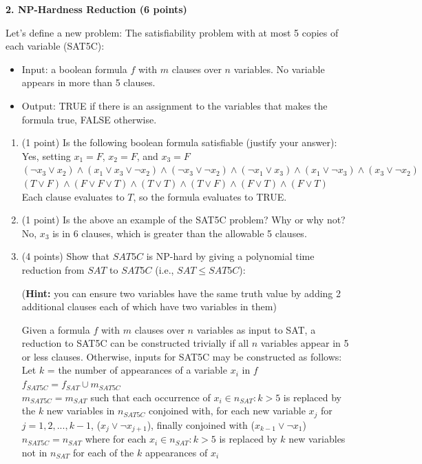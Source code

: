 \documentclass[12pt]{elsart}
\begin{document}
{\bf 2.  NP-Hardness Reduction (6 points)}

Let's define a new problem: The satisfiability problem with at most 5 copies of each variable (SAT5C):
\begin{itemize}
  \item Input: a boolean formula $f$ with $m$ clauses over $n$ variables.  No variable appears in more than 5 clauses.
  \item Output: TRUE if there is an assignment to the variables that makes the formula true, FALSE otherwise.
\end{itemize}

\begin{enumerate}
\item (1 point) Is the following boolean formula satisfiable (justify your answer): \\
Yes, setting $x_1 = F$, $x_2 = F$, and $x_3 = F$ \\
{\normalsize $  ( \neg x_3 \vee  x_2) \wedge (x_1 \vee x_3 \vee \neg x_2) \wedge ( \neg x_3 \vee \neg x_2) \wedge (\neg x_1 \vee x_3)  \wedge (x_1 \vee \neg x_3) \wedge ( x_3 \vee \neg x_2)$} \\
{\normalsize $  ( T \vee  F) \wedge (F \vee F \vee T) \wedge (T \vee T) \wedge (T \vee F)  \wedge (F \vee T) \wedge (F \vee T)$} \\
Each clause evaluates to $T$, so the formula evaluates to TRUE.

\item (1 point) Is the above an example of the SAT5C problem?  Why or why not? \\
No, $x_3$ is in 6 clauses, which is greater than the allowable 5 clauses.

\newpage

\item (4 points) Show that $SAT5C$ is NP-hard by giving a polynomial time reduction from $SAT$ to $SAT5C$ (i.e., {\bf $SAT \leq SAT5C$}):

({\bf Hint:} you can ensure two variables have the same truth value by adding 2 additional clauses each of which have two variables in them) 

Given a formula $f$ with $m$ clauses over $n$ variables as input to SAT, a reduction to SAT5C can be constructed trivially if all $n$ variables appear in 5 or less clauses. Otherwise, inputs for SAT5C may be constructed as follows: \\
Let $k$ = the number of appearances of a variable $x_i$ in $f$ \\
$f_{SAT5C} = f_{SAT} \cup m_{SAT5C}$ \\
$m_{SAT5C} = m_{SAT}$ such that each occurrence of $x_i \in n_{SAT} : k > 5$ is replaced by the $k$ new variables in $n_{SAT5C}$ conjoined with, for each new variable $x_j$ for $j = 1,2,...,k - 1$, ($x_j \vee \neg x_{j+1}$), finally conjoined with ($x_{k-1} \vee \neg x_{1}$) \\
$n_{SAT5C} = n_{SAT}$ where for each $x_i \in n_{SAT} : k > 5$ is replaced by $k$ new variables not in $n_{SAT}$ for each of the $k$ appearances of $x_i$



\end{enumerate}
\end{document}
